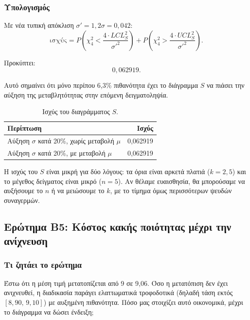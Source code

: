 \documentclass[12pt,a4paper]{article}
\begin{document}
\subsubsection*{Υπολογισμός}

Με νέα τυπική απόκλιση \(\sigma'=1{,}2\sigma=0{,}042\):
\[
    \text{ισχύς}=P\!\left(\chi^2_4<\frac{4\cdot LCL_S^2}{\sigma'^2}\right)
    + P\!\left(\chi^2_4>\frac{4\cdot UCL_S^2}{\sigma'^2}\right).
\]

Προκύπτει:
\[
    \boxed{0{,}062919}.
\]

Αυτό σημαίνει ότι μόνο περίπου 6,3\% πιθανότητα έχει το διάγραμμα \(S\) να
πιάσει την αύξηση της μεταβλητότητας στην επόμενη δειγματοληψία.

\begin{table}[H]
\centering
\caption{Ισχύς του διαγράμματος \(S\).}
\begin{tabular}{lr}
\toprule
\textbf{Περίπτωση} & \textbf{Ισχύς} \\
\midrule
Αύξηση \(\sigma\) κατά 20\%, χωρίς μεταβολή \(\mu\) & 0,062919 \\
Αύξηση \(\sigma\) κατά 20\%, με μεταβολή \(\mu\) & 0,062919 \\
\bottomrule
\end{tabular}
\end{table}

\begin{intuition}
Η ισχύς του \(S\) είναι μικρή για δύο λόγους: τα όρια είναι αρκετά πλατιά
(\(k=2{,}5\)) και το μέγεθος δείγματος είναι μικρό (\(n=5\)). Αν θέλαμε
ευαισθησία, θα μπορούσαμε να αυξήσουμε το \(n\) ή να μειώσουμε το \(k\), με
το τίμημα όμως περισσότερων ψευδών συναγερμών.
\end{intuition}

\subsection{Ερώτημα Β5: Κόστος κακής ποιότητας μέχρι την ανίχνευση}

\subsubsection*{Τι ζητάει το ερώτημα}

Έστω ότι η μέση τιμή μετατοπίζεται από 9 σε 9,06. Όσο η μετατόπιση δεν έχει
ανιχνευθεί, η διαδικασία παράγει ελαττωματικά τροφοδοτικά (δηλαδή τάση εκτός
\([8{,}90,\,9{,}10]\)) με αυξημένη πιθανότητα. Πόσο μας στοιχίζει αυτό
οικονομικά, μέχρι το διάγραμμα να δώσει ένδειξη;
\end{document}
